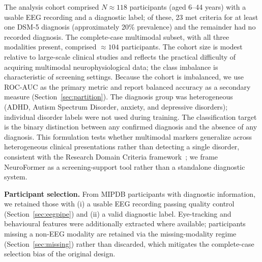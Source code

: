 The analysis cohort comprised $N \approx 118$ participants (aged 6--44 years) with a
usable EEG recording and a diagnostic label; of these, 23 met criteria for at least
one DSM-5 diagnosis (approximately 20\% prevalence) and the remainder had no recorded
diagnosis. The complete-case multimodal subset, with all three modalities present,
comprised $\approx 104$ participants. The cohort size is modest relative to
large-scale clinical studies and reflects the practical difficulty of acquiring
multimodal neurophysiological data; the class imbalance is characteristic of
screening settings. Because the cohort is imbalanced, we use ROC-AUC as the primary
metric and report balanced accuracy as a secondary measure
(Section~\ref{sec:partition}). The diagnosis group was heterogeneous (ADHD, Autism
Spectrum Disorder, anxiety, and depressive disorders); individual disorder labels
were not used during training. The classification target is the binary distinction
between any confirmed diagnosis and the absence of any diagnosis. This formulation
tests whether multimodal markers generalize across heterogeneous clinical
presentations rather than detecting a single disorder, consistent with the Research
Domain Criteria framework~\cite{Insel2014}; we frame NeuroFormer as a
screening-support tool rather than a standalone diagnostic system.

\textbf{Participant selection.} From MIPDB participants with diagnostic information,
we retained those with (i) a usable EEG recording passing quality control
(Section~\ref{sec:eegpipe}) and (ii) a valid diagnostic label. Eye-tracking and
behavioural features were additionally extracted where available; participants
missing a non-EEG modality are retained via the missing-modality regime
(Section~\ref{sec:missing}) rather than discarded, which mitigates the
complete-case selection bias of the original design.

